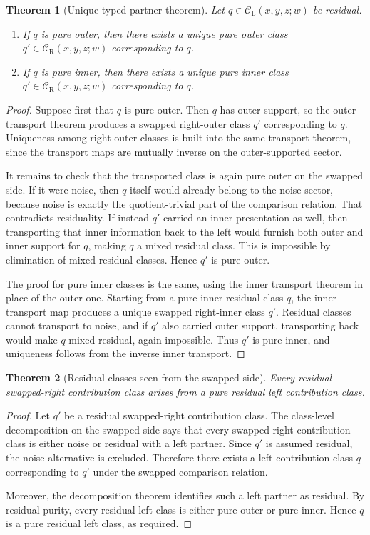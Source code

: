 \documentclass[11pt]{article}
\newtheorem{theorem}{Theorem}
\newcommand{\CL}{\mathcal{C}_{\mathrm{L}}}
\newcommand{\CR}{\mathcal{C}_{\mathrm{R}}}
\begin{document}
\begin{theorem}[Unique typed partner theorem]
Let \(q\in \CL(x,y,z;w)\) be residual.
\begin{enumerate}[label=\textup{(\roman*)}]
\item If \(q\) is pure outer, then there exists a unique pure outer class
\(q'\in \CR(x,y,z;w)\) corresponding to \(q\).
\item If \(q\) is pure inner, then there exists a unique pure inner class
\(q'\in \CR(x,y,z;w)\) corresponding to \(q\).
\end{enumerate}
\end{theorem}

\begin{proof}
Suppose first that \(q\) is pure outer. Then \(q\) has outer support, so the
outer transport theorem produces a swapped right-outer class \(q'\)
corresponding to \(q\). Uniqueness among right-outer classes is built into the
same transport theorem, since the transport maps are mutually inverse on the
outer-supported sector.

It remains to check that the transported class is again pure outer on the
swapped side. If it were noise, then \(q\) itself would already belong to the
noise sector, because noise is exactly the quotient-trivial part of the
comparison relation. That contradicts residuality. If instead \(q'\) carried an
inner presentation as well, then transporting that inner information back to
the left would furnish both outer and inner support for \(q\), making \(q\) a
mixed residual class. This is impossible by elimination of mixed residual
classes. Hence \(q'\) is pure outer.

The proof for pure inner classes is the same, using the inner transport theorem
in place of the outer one. Starting from a pure inner residual class \(q\), the
inner transport map produces a unique swapped right-inner class \(q'\). Residual
classes cannot transport to noise, and if \(q'\) also carried outer support,
transporting back would make \(q\) mixed residual, again impossible. Thus
\(q'\) is pure inner, and uniqueness follows from the inverse inner transport.
\end{proof}

\begin{theorem}[Residual classes seen from the swapped side]
Every residual swapped-right contribution class arises from a pure residual
left contribution class.
\end{theorem}

\begin{proof}
Let \(q'\) be a residual swapped-right contribution class. The class-level
decomposition on the swapped side says that every swapped-right contribution
class is either noise or residual with a left partner. Since \(q'\) is
assumed residual, the noise alternative is excluded. Therefore there exists a
left contribution class \(q\) corresponding to \(q'\) under the swapped
comparison relation.

Moreover, the decomposition theorem identifies such a left partner as residual.
By residual purity, every residual left class is either pure outer or pure
inner. Hence \(q\) is a pure residual left class, as required.
\end{proof}
\end{document}
